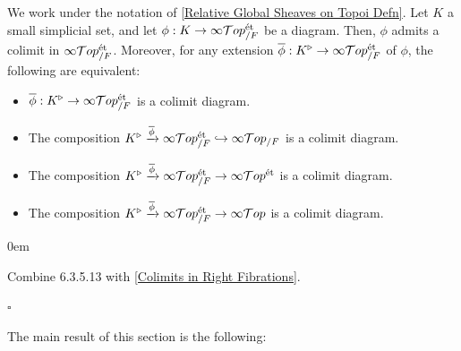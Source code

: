 \documentclass[10pt]{article}
\newcommand{\cT}{\mathcal{T}}
\renewcommand{\qed}{\hfill$\square$}
\renewenvironment{proof}{\begin{addmargin}[1em]{0em}\begin{newproof}}{\end{newproof}\end{addmargin}\qed}
\theoremstyle{witharg}
\theoremstyle{witharg}
\theoremstyle{witharg2}
\begin{document}
\begin{proposition}{}\label{Colimits over Global Sheaves on Topoi}

 We work under the notation of \ref{Relative Global Sheaves on Topoi Defn}. Let $K$ a small simplicial set, and let $\phi:K\rightarrow \infty\cT op^{\textnormal{\'{e}t}}_{/F}$ be a diagram. Then, $\phi$ admits a colimit in $\infty\cT op^{\textnormal{\'{e}t}}_{/F}$. Moreover, for any extension $\overline{\phi}:K^\triangleright\rightarrow \infty\cT op^{\textnormal{\'{e}t}}_{/F}$ of $\phi$, the following are equivalent:

 \begin{itemize}
     \item [$(1)$] $\overline{\phi}:K^\triangleright\rightarrow \infty\cT op^{\textnormal{\'{e}t}}_{/F}$ is a colimit diagram. 

     \item [$(2)$] The composition $K^\triangleright\xrightarrow{\overline{\phi}} \infty\cT op^{\textnormal{\'{e}t}}_{/F}\hookrightarrow \infty\cT op_{/F}$ is a colimit diagram. 

     \item [$(3)$]  The composition $K^\triangleright\xrightarrow{\overline{\phi}} \infty\cT op^{\textnormal{\'{e}t}}_{/F}\rightarrow\infty\cT op^{\textnormal{\'{e}t}}$ is a colimit diagram. 

     \item [$(4)$]  The composition $K^\triangleright\xrightarrow{\overline{\phi}} \infty\cT op^{\textnormal{\'{e}t}}_{/F}\rightarrow\infty\cT op$ is a colimit diagram. 
 \end{itemize}
    
\end{proposition}

\begin{proof}

    Combine  6.3.5.13 with \ref{Colimits in Right Fibrations}. 
    
\end{proof}


\noindent The main result of this section is the following:
\end{document}
